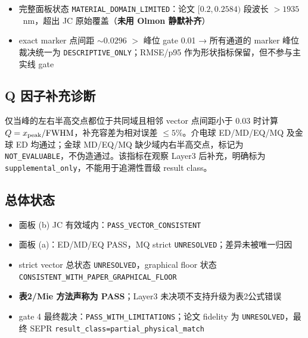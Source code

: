 \begin{itemize}
  \item 完整面板状态 \texttt{MATERIAL\_DOMAIN\_LIMITED}：论文 $[0.2, 0.2584)$ 段波长 $>1935$~nm，超出 JC 原始覆盖（\textbf{未用 Olmon 静默补齐}）
  \item exact marker 点间距 $\sim0.0296$ $>$ 峰位 gate 0.01 → 所有通道的 marker 峰位裁决统一为 \texttt{DESCRIPTIVE\_ONLY}；RMSE/p95 作为形状指标保留，但不参与主实线 gate
\end{itemize}

\subsection{Q 因子补充诊断}

仅当峰的左右半高交点都位于共同域且相邻 vector 点间距小于 0.03 时计算
$Q=x_{\rm peak}/{\rm FWHM}$，补充容差为相对误差 $\le5\%$。介电球 ED/MD/EQ/MQ
及金球 ED 均通过；金球 MD/EQ/MQ 缺少域内右半高交点，标记为
\texttt{NOT\_EVALUABLE}，不伪造通过。该指标在观察 Layer3 后补充，明确标为
\texttt{supplemental\_only}，不能用于追溯性晋级 result class。

\subsection{总体状态}

\begin{itemize}
  \item 面板 (b) JC 有效域内：\texttt{PASS\_VECTOR\_CONSISTENT}
  \item 面板 (a)：ED/MD/EQ PASS，MQ strict \texttt{UNRESOLVED}；差异未被唯一归因
  \item strict vector 总状态 \texttt{UNRESOLVED}，graphical floor 状态 \texttt{CONSISTENT\_WITH\_PAPER\_GRAPHICAL\_FLOOR}
  \item \textbf{表2/Mie 方法声称为 PASS}；Layer3 未决项不支持升级为表2公式错误
  \item gate 4 最终裁决：\texttt{PASS\_WITH\_LIMITATIONS}；论文 fidelity 为 \texttt{UNRESOLVED}，最终 SEPR \texttt{result\_class=partial\_physical\_match}
\end{itemize}
